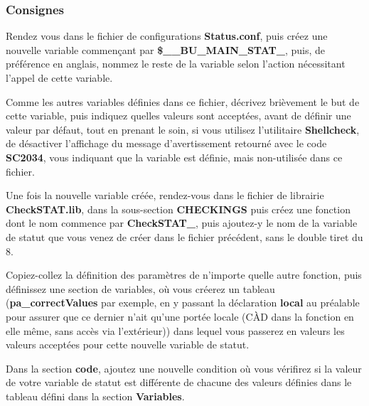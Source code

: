 \documentclass[a4paper,10pt]{article}
\begin{document}
\color{sec3}
\subsubsection{Consignes}\color{text}

\begin{justify}
    Rendez vous dans le fichier de configurations \textbf{\color{path}Status.conf}, puis créez une nouvelle variable commençant par \textbf{\color{vars}\$\_\_BU\_MAIN\_STAT\_}, puis, de préférence en anglais, nommez le reste de la variable selon l'action nécessitant l'appel de cette variable.
\end{justify}

\begin{justify}
    Comme les autres variables définies dans ce fichier, décrivez brièvement le but de cette variable, puis indiquez quelles valeurs sont acceptées, avant de définir une valeur par défaut, tout en prenant le soin, si vous utilisez l'utilitaire \textbf{\color{cmds}Shellcheck}, de désactiver l'affichage du message d'avertissement retourné avec le code \textbf{SC2034}, vous indiquant que la variable est définie, mais non-utilisée dans ce fichier.
\end{justify}

\begin{justify}
    Une fois la nouvelle variable créée, rendez-vous dans le fichier de librairie \textbf{\color{path}CheckSTAT.lib}, dans la sous-section \textbf{CHECKINGS} puis créez une fonction dont le nom commence par \textbf{\color{mauve}CheckSTAT\_}, puis ajoutez-y le nom de la variable de statut que vous venez de créer dans le fichier précédent, sans le double tiret du 8.
\end{justify}

\begin{justify}
    Copiez-collez la définition des paramètres de n'importe quelle autre fonction, puis définissez une section de variables, où vous créerez un tableau (\textbf{pa\_correctValues} par exemple, en y passant la déclaration \textbf{\color{cmds}local} au préalable pour assurer que ce dernier n'ait qu'une portée locale (CÀD dans la fonction en elle même, sans accès via l'extérieur)) dans lequel vous passerez en valeurs les valeurs acceptées pour cette nouvelle variable de statut.
\end{justify}

\begin{justify}
    Dans la section \textbf{code}, ajoutez une nouvelle condition où vous vérifirez si la valeur de votre variable de statut est différente de chacune des valeurs définies dans le tableau défini dans la section \textbf{Variables}.
\end{justify}
\end{document}
